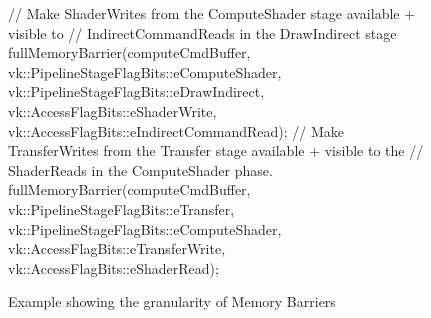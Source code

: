 \begin{figure}[hb]
    \centering
    \begin{cppcode}
// Make ShaderWrites from the ComputeShader stage available + visible to 
//      IndirectCommandReads in the DrawIndirect stage
fullMemoryBarrier(computeCmdBuffer,
    vk::PipelineStageFlagBits::eComputeShader, vk::PipelineStageFlagBits::eDrawIndirect,
    vk::AccessFlagBits::eShaderWrite, vk::AccessFlagBits::eIndirectCommandRead);
// Make TransferWrites from the Transfer stage available + visible to the
//      ShaderReads in the ComputeShader phase.
fullMemoryBarrier(computeCmdBuffer,
    vk::PipelineStageFlagBits::eTransfer, vk::PipelineStageFlagBits::eComputeShader,
    vk::AccessFlagBits::eTransferWrite, vk::AccessFlagBits::eShaderRead);
    \end{cppcode}
    \caption{Example showing the granularity of Memory Barriers}
    \label{fig:VizMemoryBarrier}
\end{figure}

